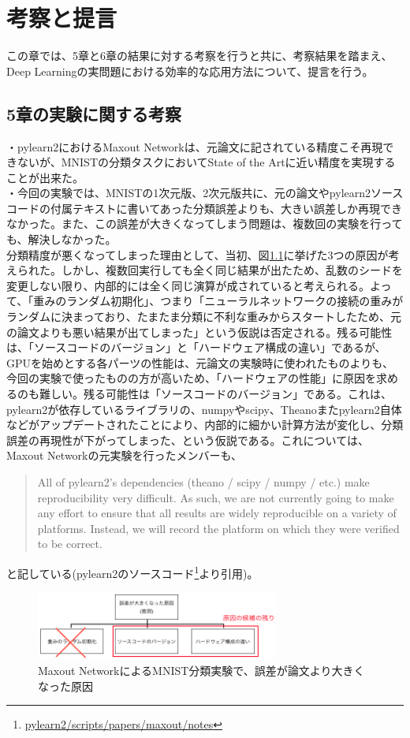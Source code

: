 \chapter{考察と提言}
この章では、5章と6章の結果に対する考察を行うと共に、考察結果を踏まえ、Deep Learningの実問題における効率的な応用方法について、提言を行う。
\section{5章の実験に関する考察}

・pylearn2におけるMaxout Networkは、元論文に記されている精度こそ再現できないが、MNISTの分類タスクにおいてState of the Artに近い精度を実現することが出来た。\\
・今回の実験では、MNISTの1次元版、2次元版共に、元の論文やpylearn2ソースコードの付属テキストに書いてあった分類誤差よりも、大きい誤差しか再現できなかった。また、この誤差が大きくなってしまう問題は、複数回の実験を行っても、解決しなかった。\\
分類精度が悪くなってしまった理由として、当初、図\ref{c7_maxout_cause}に挙げた3つの原因が考えられた。しかし、複数回実行しても全く同じ結果が出たため、乱数のシードを変更しない限り、内部的には全く同じ演算が成されていると考えられる。よって、「重みのランダム初期化」、つまり「ニューラルネットワークの接続の重みがランダムに決まっており、たまたま分類に不利な重みからスタートしたため、元の論文よりも悪い結果が出てしまった」という仮説は否定される。残る可能性は、「ソースコードのバージョン」と「ハードウェア構成の違い」であるが、GPUを始めとする各パーツの性能は、元論文の実験時に使われたものよりも、今回の実験で使ったものの方が高いため、「ハードウェアの性能」に原因を求めるのも難しい。残る可能性は「ソースコードのバージョン」である。これは、pylearn2が依存しているライブラリの、numpyやscipy、Theanoまたpylearn2自体などがアップデートされたことにより、内部的に細かい計算方法が変化し、分類誤差の再現性が下がってしまった、という仮説である。これについては、Maxout Networkの元実験を行ったメンバーも、
\begin{quote}
All of pylearn2's dependencies (theano / scipy / numpy / etc.) make reproducibility
very difficult. As such, we are not currently going to make any effort to ensure that
all results are widely reproducible on a variety of platforms. Instead, we will
record the platform on which they were verified to be correct.
\end{quote}
と記している(pylearn2のソースコード\footnote{\url{pylearn2/scripts/papers/maxout/notes}}より引用)。\\
\begin{figure}[tbp]
 \begin{center}
  \includegraphics[width=80mm]{img/c7/maxout_error_cause}
 \end{center}
 \caption{Maxout NetworkによるMNIST分類実験で、誤差が論文より大きくなった原因}
 \label{c7_maxout_cause}
\end{figure}
